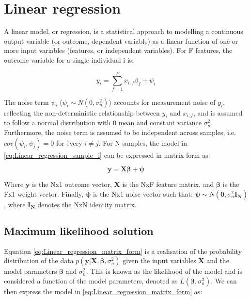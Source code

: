 
\section{Linear regression} 

A linear model, or regression, is a statistical approach to modelling a continuous output variable (or outcome, dependent variable) as a linear function of one or more input variables (features, or independent variables). 
For F features, the outcome variable for a single individual i is:

\begin{equation} \label{eq:Linear_regression_sample_i}
 y_i = \sum_{f=1}^{F} x_{i,f}\beta_f + \psi_i
\end{equation}

The noise term $\psi_i$ ($ \psi_i \sim N(0, \sigma_n^2)$) accounts for measurement noise of $y_i$, reflecting the non-deterministic relationship between $y_i$ and $x_{i,f}$, and is assumed to follow a normal distribution with 0 mean and constant variance $\sigma_n^2$. 
Furthermore, the noise term is assumed to be independent across samples, i.e. $cov(\psi_i, \psi_j)=0$ for every $i \neq j$. 
For N samples, the model in \eqref{eq:Linear_regression_sample_i} can be expressed in matrix form as:

\begin{equation} \label{eq:Linear_regression_matrix_form}
\mathbf{y} = \mathbf{X}\boldsymbol{\beta} + \boldsymbol{\psi} 
\end{equation}

Where $\mathbf{y}$ is the Nx1 outcome vector, $\mathbf{X}$ is the NxF feature matrix, and $\boldsymbol{\beta}$ is the Fx1 weight vector. 
Finally, $\boldsymbol{\psi}$ is the Nx1 noise vector such that: $\boldsymbol{\psi}\sim N(\mathbf{0}, \sigma_n^2 \mathbf{I_N})$, where $\mathbf{I_N}$ denotes the NxN identity matrix. \\ 


\subsection{Maximum likelihood solution}

Equation \eqref{eq:Linear_regression_matrix_form} is a realisation of the probability distribution of the data $p(\mathbf{y}| \mathbf{X}, \boldsymbol{\beta}, \sigma_n^2)$ given the input variables $\mathbf{X}$ and the model parameters $\boldsymbol{\beta}$ and $\sigma_n^2$.
This is known as the likelihood of the model and is considered a function of the model parameters, denoted as $L(\boldsymbol{\beta}, \sigma_n^2)$. 
We can then express the model in \eqref{eq:Linear_regression_matrix_form} as:

